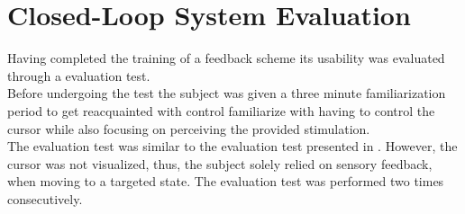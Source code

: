 

\section{Closed-Loop System Evaluation}

Having completed the training of a feedback scheme its usability was evaluated through a evaluation test. \\
Before undergoing the test the subject was given a three minute familiarization period to get reacquainted with control familiarize with having to control the cursor while also focusing on perceiving the provided stimulation. \\
The evaluation test was similar to the evaluation test presented in . However, the cursor was not visualized, thus, the subject solely relied on sensory feedback, when moving to a targeted state. The evaluation test was performed two times consecutively.